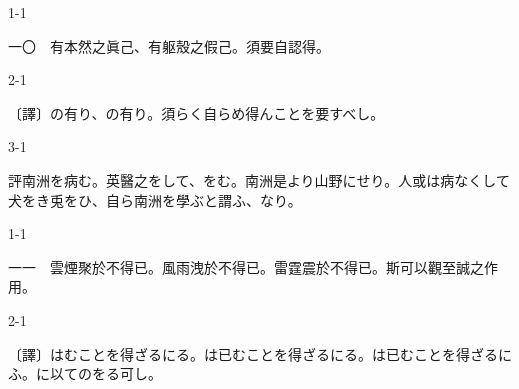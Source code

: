 \documentclass[tate,paper=b6j,jafontsize=9pt]{jlreq}
\begin{document}
\begin{azconvIndented}{1\zw}{-1\zw}

一〇　有本然之眞己、有躯殼之假己。須要自認得。

\end{azconvIndented}
\begin{azconvIndented}{2\zw}{-1\zw}

〔譯〕の有り、の有り。須らく自らめ得んことを要すべし。

\end{azconvIndented}
\begin{azconvIndented}{3\zw}{-1\zw}

評南洲を病む。英醫之をして、をむ。南洲是より山野にせり。人或は病なくして犬をき兎をひ、自ら南洲を學ぶと謂ふ、なり。

\end{azconvIndented}

\begin{azconvIndented}{1\zw}{-1\zw}

一一　雲煙聚於不\azconvKunten{\azconvIR}得已。風雨洩於不\azconvKunten{\azconvIR}得已。雷霆震於不\azconvKunten{\azconvIR}得已。斯可以觀至誠之作用。

\end{azconvIndented}
\begin{azconvIndented}{2\zw}{-1\zw}

〔譯〕はむことを得ざるにる。は已むことを得ざるにる。は已むことを得ざるにふ。に以てのをる可し。

\end{azconvIndented}
\end{document}
